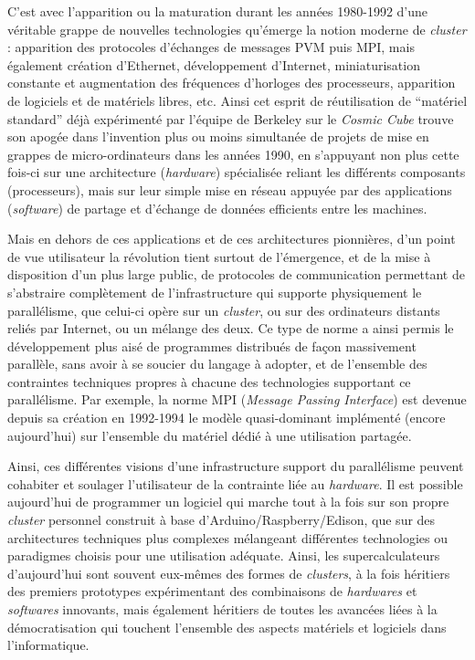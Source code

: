 C'est avec l'apparition ou la maturation durant les années 1980-1992 d'une véritable grappe de nouvelles technologies qu'émerge la notion moderne de \textit{cluster} : apparition des protocoles d'échanges de messages PVM puis MPI, mais également création d'Ethernet, développement d'Internet,  miniaturisation constante et augmentation des fréquences d'horloges des processeurs, apparition de logiciels et de matériels libres, etc. Ainsi cet esprit de réutilisation de \enquote{matériel standard} déjà expérimenté par l'équipe de Berkeley sur le \textit{Cosmic Cube} trouve son apogée dans l'invention plus ou moins simultanée de projets de mise en grappes de micro-ordinateurs dans les années 1990, en s'appuyant non plus cette fois-ci sur une architecture (\textit{hardware}) spécialisée reliant les différents composants (processeurs), mais sur leur simple mise en réseau appuyée par des applications (\textit{software}) de partage et d'échange de données efficients entre les machines.


Mais en dehors de ces applications et de ces architectures pionnières, d’un point de vue utilisateur la révolution tient surtout de l’émergence, et de la mise à disposition d’un plus large public, de protocoles de communication permettant de s’abstraire complètement de l’infrastructure qui supporte physiquement le parallélisme, que celui-ci opère sur un \textit{cluster}, ou sur des ordinateurs distants reliés par Internet, ou un mélange des deux. Ce type de norme a ainsi permis le développement plus aisé de programmes distribués de façon massivement parallèle, sans avoir à se soucier du langage à adopter, et de l’ensemble des contraintes techniques propres à chacune des technologies supportant ce parallélisme. Par exemple, la norme MPI (\textit{Message Passing Interface}) est devenue depuis sa création en 1992-1994 le modèle quasi-dominant implémenté (encore aujourd’hui) sur l’ensemble du matériel dédié à une utilisation partagée.

Ainsi, ces différentes visions d'une infrastructure support du parallélisme peuvent cohabiter et soulager l'utilisateur de la contrainte liée au \textit{hardware}. Il est possible aujourd'hui de programmer un logiciel qui marche tout à la fois sur son propre \textit{cluster} personnel construit à base d'Arduino/Raspberry/Edison, que sur des architectures techniques plus complexes mélangeant différentes technologies ou paradigmes choisis pour une utilisation adéquate. Ainsi, les supercalculateurs d'aujourd'hui sont souvent eux-mêmes des formes de \textit{clusters}, à la fois héritiers des premiers prototypes expérimentant des combinaisons de \textit{hardwares} et \textit{softwares} innovants, mais également héritiers de toutes les avancées liées à la démocratisation qui touchent l'ensemble des aspects matériels et logiciels dans l'informatique.


